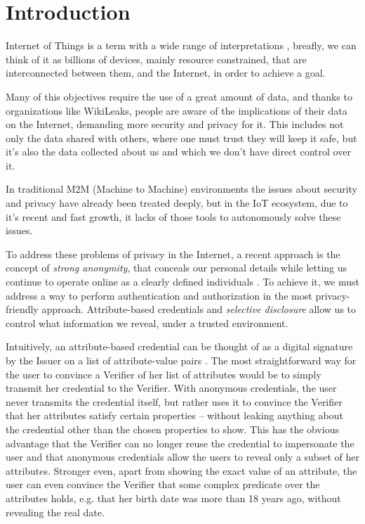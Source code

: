 
\section{Introduction}

Internet of Things is a term with a wide range of interpretations \cite{Atzori20102787}, breafly, we can think of it as billions of devices, mainly resource constrained, that are interconnected between them, and the Internet, in order to achieve a goal.

Many of this objectives require the use of a great amount of data, and thanks to organizations like WikiLeaks, people are aware of the implications of their data on the Internet, demanding more security and privacy for it. This includes not only the data shared with others, where one must trust they will keep it safe, but it's also the data collected about us and which we don't have direct control over it.

In traditional M2M (Machine to Machine) environments the issues about security and privacy have already been treated deeply, but in the IoT ecosystem, due to it's recent and fast growth, it lacks of those tools to autonomously solve these issues.

To address these problems of privacy in the Internet, a recent approach is the concept of \textit{strong anonymity}, that conceals our personal details while letting us continue to operate online as a clearly defined individuals \cite{stronganonymity}. To achieve it, we must address a way to perform authentication and authorization in the most privacy-friendly approach. Attribute-based credentials and \textit{selective disclosure} allow us to control what information we reveal, under a trusted environment.

Intuitively, an attribute-based credential can be thought of as a digital signature by the Issuer on a list of attribute-value pairs \cite{introCredIBM}.
The most straightforward way for the user to convince a Verifier of her list of attributes would be to simply transmit her credential to the Verifier.
With anonymous credentials, the user never transmits the credential itself, but rather uses it to convince the Verifier that her attributes satisfy certain properties – without leaking anything about the credential other than the chosen properties to show. This has the obvious advantage that the Verifier can no longer reuse the credential to impersonate the user and that anonymous credentials allow the users to reveal only a subset of her attributes.
Stronger even, apart from showing the exact value of an attribute, the user can even convince the
Verifier that some complex predicate over the attributes holds, e.g. that her birth date was more than 18 years ago, without revealing the real date.

